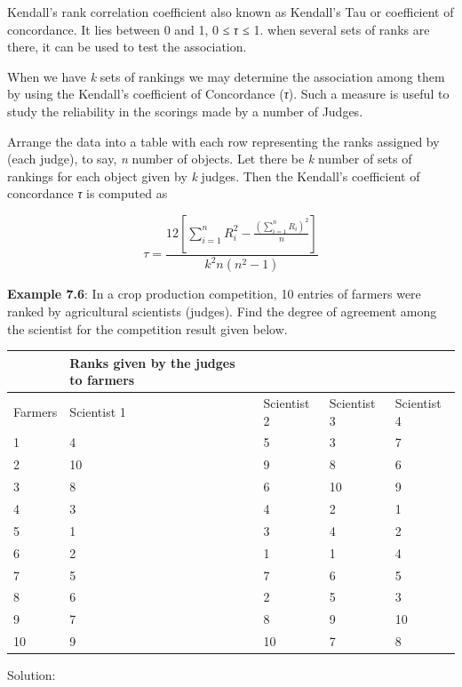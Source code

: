 \documentclass[
]{book}
\begin{document}
Kendall's rank correlation coefficient also known as Kendall's Tau or
coefficient of concordance. It lies between 0 and 1, 0 ≤ \emph{τ ≤} 1. when
several sets of ranks are there, it can be used to test the association.

When we have \emph{k} sets of rankings we may determine the association among
them by using the Kendall's coefficient of Concordance (\emph{τ}). Such a
measure is useful to study the reliability in the scorings made by a
number of Judges.

Arrange the data into a table with each row representing the ranks
assigned by (each judge), to say, \emph{n} number of objects. Let there be
\emph{k} number of sets of rankings for each object given by \emph{k} judges. Then
the Kendall's coefficient of concordance \emph{τ} is computed as

\[\tau = \frac{12\left\lbrack \sum_{i = 1}^{n}{R_{i}^{2} - \frac{\left( \sum_{i = 1}^{n}R_{i} \right)^{2}}{n}} \right\rbrack}{k^{2}n\left( n^{2} - 1 \right)}\]

\textbf{Example 7.6}: In a crop production competition, 10 entries of farmers
were ranked by agricultural scientists (judges). Find the degree of
agreement among the scientist for the competition result given below.

\begin{longtable}[]{@{}lllll@{}}
\toprule
& Ranks given by the judges to farmers & & & \\
\midrule
\endhead
Farmers & Scientist 1 & Scientist 2 & Scientist 3 & Scientist 4 \\
1 & 4 & 5 & 3 & 7 \\
2 & 10 & 9 & 8 & 6 \\
3 & 8 & 6 & 10 & 9 \\
4 & 3 & 4 & 2 & 1 \\
5 & 1 & 3 & 4 & 2 \\
6 & 2 & 1 & 1 & 4 \\
7 & 5 & 7 & 6 & 5 \\
8 & 6 & 2 & 5 & 3 \\
9 & 7 & 8 & 9 & 10 \\
10 & 9 & 10 & 7 & 8 \\
\bottomrule
\end{longtable}

Solution:
\end{document}
